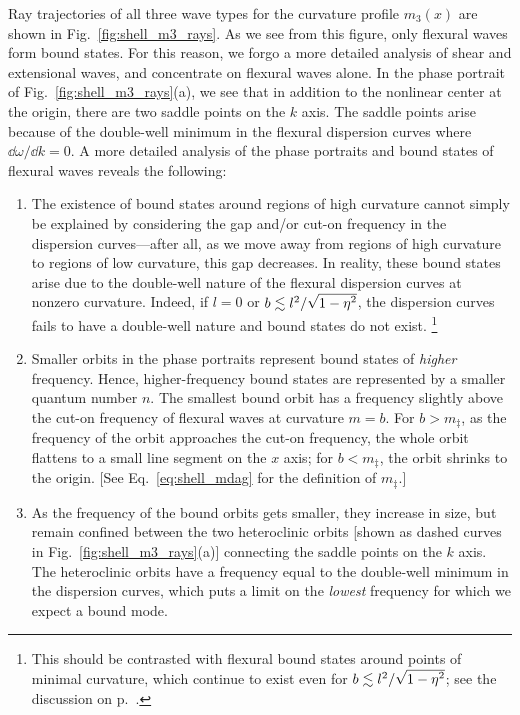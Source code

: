 Ray trajectories of all three wave types for the curvature profile $m_{3}(x)$ are shown in Fig.~\ref{fig:shell_m3_rays}.
As we see from this figure, only flexural waves form bound states.
For this reason, we forgo a more detailed analysis of shear and extensional waves, and concentrate on flexural waves alone.
In the phase portrait of Fig.~\ref{fig:shell_m3_rays}(a), we see that in addition to the nonlinear center at the origin, there are two saddle points on the $k$ axis.
The saddle points arise because of the double-well minimum in the flexural dispersion curves where $\dd{\omega}/\dd{k} = 0$.
A more detailed analysis of the phase portraits and bound states of flexural waves reveals the following:
%
\begin{enumerate}
  \item
    The existence of bound states around regions of high curvature cannot simply be explained by considering the gap and/or cut-on frequency in the dispersion curves---after all, as we move away from regions of high curvature to regions of low curvature, this gap decreases.
    In reality, these bound states arise due to the double-well nature of the flexural dispersion curves at nonzero curvature.
    Indeed, if $l = 0$ or $b \lesssim l^{2}/\sqrt{\smash[b]{1-\eta^{2}}}$, the dispersion curves fails to have a double-well nature and bound states do not exist.%
    \footnote{This should be contrasted with flexural bound states around points of minimal curvature, which continue to exist even for $b \lesssim l^{2}/\sqrt{\smash[b]{1-\eta^{2}}}$; see the discussion on p.~\pageref{sec:shell_flexural}.}
  \item Smaller orbits in the phase portraits represent bound states of \emph{higher} frequency.
    Hence, higher-frequency bound states are represented by a smaller quantum number $n$.
    The smallest bound orbit has a frequency slightly above the cut-on frequency of flexural waves at curvature $m = b$.
    For $b > m_{\ddag}$, as the frequency of the orbit approaches the cut-on frequency, the whole orbit flattens to a small line segment on the $x$ axis; for $b < m_{\ddag}$, the orbit shrinks to the origin. [See Eq.~\eqref{eq:shell_mdag} for the definition of $m_{\ddag}$.]
  \item As the frequency of the bound orbits gets smaller, they increase in size, but remain confined between the two heteroclinic orbits [shown as dashed curves in Fig.~\ref{fig:shell_m3_rays}(a)] connecting the saddle points on the $k$ axis.
    The heteroclinic orbits have a frequency equal to the double-well minimum in the dispersion curves, which puts a limit on the \emph{lowest} frequency for which we expect a bound mode.

\end{enumerate}
